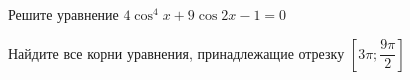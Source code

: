 \begin{ex}
	\begin{condition}
		\begin{enumcols}[label=\asbuk*)]
			\item Решите уравнение \( 4\cos^4 x + 9\cos 2x - 1 = 0 \)
			\item Найдите все корни уравнения, принадлежащие отрезку \( \left[3\pi;\dfrac{9\pi}{2}\right]  \)
		\end{enumcols}
	\end{condition}
\end{ex}